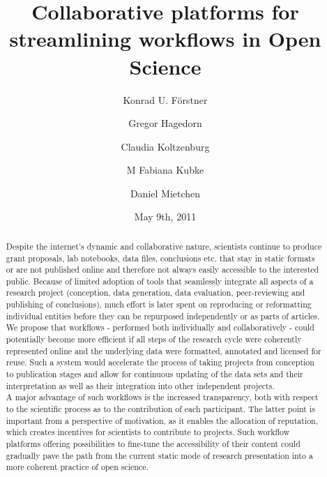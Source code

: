\documentclass{article}
\begin{document}
\title{Collaborative platforms for streamlining workflows in Open Science }

\author[1, 2]{Konrad U. Förstner}
\author[3]{Gregor Hagedorn}

\author[4]{Claudia Koltzenburg}

\author[5]{M Fabiana Kubke}

\author[6]{Daniel Mietchen}

\date{May 9th, 2011}

\maketitle

\begin{abstract}

Despite the internet's dynamic and collaborative nature, scientists
continue to produce grant proposals, lab notebooks, data files,
conclusions etc. that stay in static formats or are not published
online and therefore not always easily accessible to the interested
public. Because of limited adoption of tools that seamlessly integrate
all aspects of a research project (conception, data generation, data
evaluation, peer-reviewing and publishing of conclusions), much effort
is later spent on reproducing or reformatting individual entities
before they can be repurposed independently or as parts of articles.\\

We propose that workflows - performed both individually and
collaboratively - could potentially become more efficient if all steps
of the research cycle were coherently represented online and the
underlying data were formatted, annotated and licensed for reuse. Such
a system would accelerate the process of taking projects from
conception to publication stages and allow for continuous updating of
the data sets and their interpretation as well as their integration
into other independent projects.\\

A major advantage of such workflows is the increased transparency,
both with respect to the scientific process as to the contribution of
each participant. The latter point is important from a perspective of
motivation, as it enables the allocation of reputation, which creates
incentives for scientists to contribute to projects. Such workflow
platforms offering possibilities to fine-tune the accessibility of
their content could gradually pave the path from the current static
mode of research presentation into a more coherent practice of open
science.\\

\end{abstract}
\end{document}
